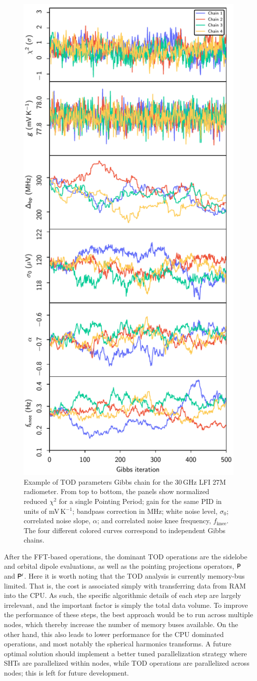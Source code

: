 \documentclass[onecolumn]{aa}
\renewcommand{\P}[0]{\tens{P}}
\begin{document}
\begin{figure}[t]
  \center
  \includegraphics[width=0.5\linewidth]{figs/traceplot_BP10.pdf}
  \caption{Example of TOD parameters Gibbs chain for the 30\,GHz LFI 27M
    radiometer. From top to bottom, the panels show normalized reduced
    $\chi^2$ for a single Pointing Period; gain for the same PID in
    units of mV\,K$^{-1}$; bandpass correction in MHz; white noise
    level, $\sigma_0$; correlated noise slope, $\alpha$; and
    correlated noise knee frequency, $f_{\mathrm{knee}}$. The four
    different colored curves correspond to independent Gibbs
    chains.}\label{fig:traceplot}
\end{figure}


After the FFT-based operations, the dominant TOD operations are the
sidelobe and orbital dipole evaluations, as well as the pointing
projections operators, $\P$ and $\P^t$. Here it is worth noting that
the TOD analysis is currently memory-bus limited. That is, the cost is
associated simply with transferring data from RAM into the CPU. As
such, the specific algorithmic details of each step are largely
irrelevant, and the important factor is simply the total data
volume. To improve the performance of these steps, the best approach
would be to run across multiple nodes, which thereby increase the
number of memory buses available. On the other hand, this also leads
to lower performance for the CPU dominated operations, and most
notably the spherical harmonics transforms. A future optimal solution
should implement a better tuned parallelization strategy where SHTs
are parallelized within nodes, while TOD operations are parallelized
across nodes; this is left for future development.
\end{document}
